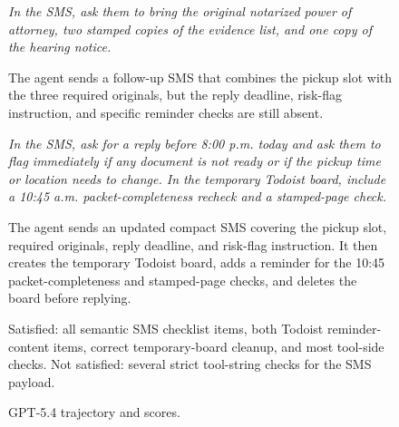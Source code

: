\begin{figure}[h]
{    \vspace{3pt}
    \emph{In the SMS, ask them to bring the original notarized power of attorney, two stamped copies of the evidence list, and one copy of the hearing notice.}

    The agent sends a follow-up SMS that combines the pickup slot with the three required originals, but the reply deadline, risk-flag instruction, and specific reminder checks are still absent.

    \vspace{3pt}
    \emph{In the SMS, ask for a reply before 8:00 p.m. today and ask them to flag immediately if any document is not ready or if the pickup time or location needs to change. In the temporary Todoist board, include a 10:45 a.m. packet-completeness recheck and a stamped-page check.}

    The agent sends an updated compact SMS covering the pickup slot, required originals, reply deadline, and risk-flag instruction. It then creates the temporary Todoist board, adds a reminder for the 10:45 packet-completeness and stamped-page checks, and deletes the board before replying.

    \vspace{3pt}
    \hspace{3pt}

    \vspace{2pt}
    \noindent{}
    Satisfied: all semantic SMS checklist items, both Todoist reminder-content items, correct temporary-board cleanup, and most tool-side checks.
    Not satisfied: several strict tool-string checks for the SMS payload.
    }
    \caption{GPT-5.4 trajectory and scores.}
    \label{fig:case_leihaodi_1_gpt54_trajectory}
\end{figure}

